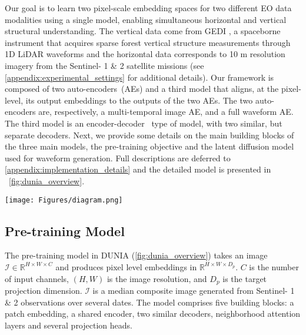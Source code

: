 Our goal is to learn two pixel-scale embedding spaces for two different EO data modalities using a single model, enabling simultaneous horizontal and vertical structural understanding. The vertical data come from GEDI \cite{Dubayah_etal_2020}, a spaceborne instrument that acquires sparse forest vertical structure measurements through 1D LiDAR waveforms and the horizontal data corresponds to 10 m resolution imagery from the Sentinel- 1 \& 2 satellite missions (see \autoref{appendix:experimental_settings} for additional details).
Our framework is composed of two auto-encoders~(AEs) and a third model that aligns, at the pixel-level, its output embeddings to the outputs of the two AEs. The two auto-encoders are, respectively, a multi-temporal image AE, and a full waveform AE. The third model is an encoder-decoder~ type of model, with two similar, but separate decoders. Next, we provide some details on the main building blocks of the three main models, the pre-training objective and the latent diffusion model used for waveform generation. Full descriptions are deferred to \autoref{appendix:implementation_details} and the detailed model is presented in ~\cref{fig:dunia_overview}. 

\begin{figure*}[ht]
\begin{center}
\texttt{[image: Figures/diagram.png]}
\end{center}
\vskip-0.3cm
\caption{An overview of our framework showcasing the main blocks and connections. The pre-training model, which take as input as single date S-1 \& 2 image mosaic, is shaded in blue. The multi-temporal image AE, which take as input a multi-date S-1\& S2 image mosaic, is shaded in yellow. The vertical structure AE, which take as input the GEDI waveforms, is shaded in green.
}
\label{fig:dunia_overview}
\vskip-0.14cm
\end{figure*}

\subsection{Pre-training Model}
\label{sec:image-encodec}
The pre-training model in DUNIA (\cref{fig:dunia_overview}) takes an image $\mathcal{I} \in \mathbb{R}^{H \times W \times C}$ and produces pixel level embeddings in $\mathbb{R}^{H \times W \times D_p}$. $C$ is the number of input channels, $(H,W)$ is the image resolution, and $D_p$ is the target projection dimension. $\mathcal{I}$ is a median composite image generated from Sentinel- 1 \& 2 observations over several dates. The model comprises five building blocks: a patch embedding, a shared encoder, two similar decoders, neighborhood attention layers and several projection heads. 

